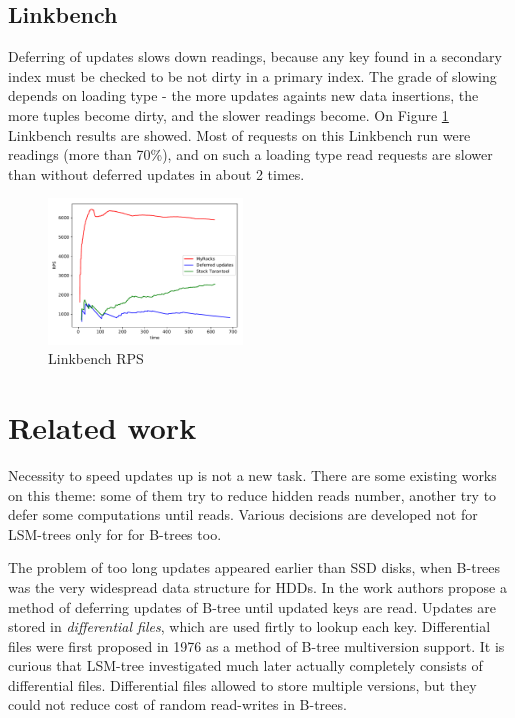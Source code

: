 \documentclass{vldb}
\begin{document}
\subsection{Linkbench}

Deferring of updates slows down readings, because any key found in a secondary
index must be checked to be not dirty in a primary index. The grade of slowing
depends on loading type - the more updates againts new data insertions, the more
tuples become dirty, and the slower readings become. On Figure
\ref{fig:linkbench} Linkbench \cite{Armstrong:linkbench} results are showed.
Most of requests on this Linkbench run were readings (more than 70\%), and on
such a loading type read requests are slower than without deferred updates in
about 2 times.

\begin{figure}
\centering
\includegraphics[width=0.46\textwidth]{linkbench}
\caption{Linkbench RPS}
\label{fig:linkbench}
\end{figure}

\section{Related work}
Necessity to speed updates up is not a new task. There are some existing works
on this theme: some of them try to reduce hidden reads number, another try to
defer some computations until reads. Various decisions are developed not for
LSM-trees only for for B-trees too.

The problem of too long updates appeared earlier than SSD disks, when B-trees
was the very widespread data structure for HDDs. In the work
\cite{Edward:incremental_update} authors propose a method of deferring updates
of B-tree until updated keys are read. Updates are stored in
\textit{differential files}, which are used firtly to lookup each key.
Differential files were first proposed in 1976 \cite{Lohman:differential_files}
as a method of B-tree multiversion support. It is curious that LSM-tree
investigated much later actually completely consists of differential files.
Differential files allowed to store multiple versions, but they could not reduce
cost of random read-writes in B-trees.
\end{document}
